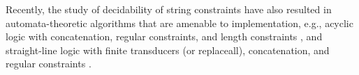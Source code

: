  





 
 
 
Recently, the study of decidability of string constraints have also resulted in automata-theoretic algorithms that are amenable to implementation, e.g.,
 acyclic logic with concatenation, regular constraints, and length constraints 
 \cite{Abdulla14}, and straight-line logic with finite transducers (or
 replaceall), concatenation, and regular constraints 
 \cite{HJLRV18,fang-yu-circuits,WC+18,CHL+19}. 
 
 
 

 
